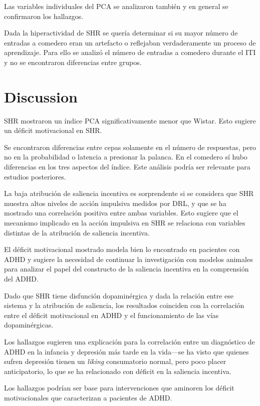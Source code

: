 \documentclass[a4paper,12pt]{article}
\begin{document}
Las variables individuales del PCA se analizaron también y en general se confirmaron los hallazgos.

Dada la hiperactividad de SHR se quería determinar si su mayor número de entradas a comedero eran un artefacto o reflejaban verdaderamente un proceso de aprendizaje.
Para ello se analizó el número de entradas a comedero durante el ITI y no se encontraron diferencias entre grupos.

\section{Discussion}

SHR mostraron un índice PCA significativamente menor que Wistar.
Esto sugiere un déficit motivacional en SHR.

Se encontraron diferencias entre cepas solamente en el número de respuestas, pero no en la probabilidad o latencia a presionar la palanca.
En el comedero sí hubo diferencias en los tres aspectos del índice.
Este análisis podría ser relevante para estudios posteriores.

La baja atribución de saliencia incentiva es sorprendente si se considera que SHR muestra altos niveles de acción impulsiva medidos por DRL, y que se ha mostrado una correlación positiva entre ambas variables.
Esto sugiere que el mecanismo implicado en la acción impulsiva en SHR se relaciona con variables distintas de la atribución de saliencia incentiva.

El déficit motivacional mostrado modela bien lo encontrado en pacientes con ADHD y sugiere la necesidad de continuar la investigación con modelos animales para analizar el papel del constructo de la saliencia incentiva en la comprensión del ADHD.

Dado que SHR tiene disfunción dopaminérgica y dada la relación entre ese sistema y la atribución de saliencia, los resultados coinciden con la correlación entre el déficit motivacional en ADHD y el funcionamiento de las vías dopaminérgicas.

Los hallazgos sugieren una explicación para la correlación entre un diagnóstico de ADHD en la infancia y depresión más tarde en la vida---se ha visto que quienes sufren depresión tienen un {\itshape liking} consumatorio normal, pero poco placer anticipatorio, lo que se ha relacionado con déficit en la saliencia incentiva.

Los hallazgos podrían ser base para intervenciones que aminoren los déficit motivacionales que caracterizan a pacientes de ADHD.
\end{document}
